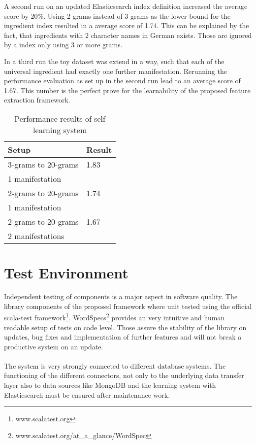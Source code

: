 A second run on an updated Elasticsearch index definition increased the average score by 20\%. Using 2-grams instead of 3-grams as the lower-bound for the ingredient index resulted in a average score of 1.74. This can be explained by the fact, that ingredients with 2 character names in German exists. Those are ignored by a index only using 3 or more grams.

In a third run the toy dataset was extend in a way, such that each of the universal ingredient had exactly one further manifestation. Rerunning the performance evaluation as set up in the second run lead to an average score of 1.67. This number is the perfect prove for the learnability of the proposed feature extraction framework.

\begin{table}[htb]
\centering
\begin{tabular}[t]{|l|l|}
\hline
Setup & Result \\
\hline
\hline
3-grams to 20-grams & 1.83 \\
1 manifestation & \\
\hline
2-grams to 20-grams & 1.74 \\
1 manifestation & \\
\hline
2-grams to 20-grams & 1.67\\ 
2 manifestations & \\
\hline
\end{tabular}
\caption{Performance results of self learning system}
\label{tab:singlesource}
\end{table}

\section{Test Environment\label{sec:testenvir}}

Independent testing of components is a major aspect in software quality. The library components of the proposed framework where unit tested using the official scala-test framework\footnote{www.scalatest.org}. WordSpecs\footnote{www.scalatest.org/at\_a\_glance/WordSpec} provides an very intuitive and human readable setup of tests on code level. Those assure the stability of the library on updates, bug fixes and implementation of further features and will not break a productive system on an update. 
\\\\
The system is very strongly connected to different database systems. The functioning of the different connectors, not only to the underlying data transfer layer also to data sources like MongoDB and the learning system with Elasticsearch must be ensured after maintenance work. 


